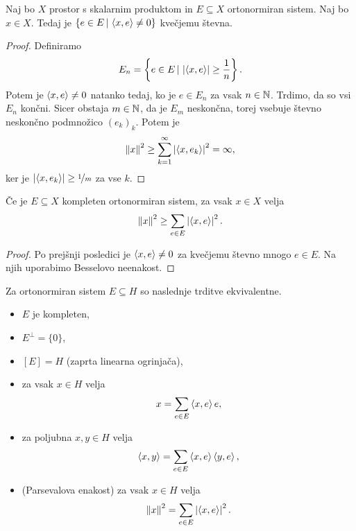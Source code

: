 
\begin{posledica}
  Naj bo $X$ prostor s skalarnim produktom in $E \subseteq X$ ortonormiran
  sistem.
  Naj bo $x \in X$.
  Tedaj je $\{e \in E \,|\, \left< x,e \right> \ne 0\}$ kvečjemu števna.
\end{posledica}

\begin{proof}
  Definiramo
  \[
	E_n = \left\{e \in E \,|\, \left| \left< x,e \right> \right| \ge \frac{1}{n}\right\}.
  \]
  Potem je $\left< x,e \right> \ne 0$ natanko tedaj, ko je $e \in E_n$ za vsak $n \in \mathbb{N}$.
  Trdimo, da so vsi $E_n$ končni.
  Sicer obstaja $m \in \mathbb{N}$, da je $E_m$ neskončna, torej vsebuje števno
  neskončno podmnožico $(e_k)_k$.
  Potem je
  \[
	\left\lVert x\right\rVert^2 \ge \sum_{k=1}^\infty \left| \left< x, e_k \right> \right|^2 = \infty,
  \]
  ker je $\left| \left< x,e_k \right> \right| \ge \nicefrac{1}{m}$ za vse $k$.
\end{proof}


\begin{posledica}
  Če je $E \subseteq X$ kompleten ortonormiran sistem, za vsak $x \in X$ velja
  \[
	\left\lVert x\right\rVert^2 \ge \sum_{e \in E} \left| \left< x, e \right> \right|^2.
  \]
\end{posledica}

\begin{proof}
  Po prejšnji posledici je $\left< x, e \right> \ne 0$ za kvečjemu števno mnogo $e \in E$.
  Na njih uporabimo Besselovo neenakost.
\end{proof}

\begin{izrek}
  Za ortonormiran sistem $E \subseteq H$ so naslednje trditve ekvivalentne.
  \begin{itemize}
  \item $E$ je kompleten,
  \item $E^\bot = \{0\}$,
  \item $[E] = H$ (zaprta linearna ogrinjača),
  \item za vsak $x \in H$ velja
	\[
	  x = \sum_{e \in E} \left< x,e \right> e,
	\]
  \item za poljubna $x, y \in H$ velja
	\[
	  \left< x,y \right> = \sum_{e \in E} \left< x,e \right> \left< y,e \right>,
	\]
  \item (Parsevalova enakost) za vsak $x \in H$ velja
	\[
	  \left\lVert x\right\rVert^2 = \sum_{e \in E} \left| \left< x, e \right> \right|^2.
	\]
  \end{itemize}
\end{izrek}

